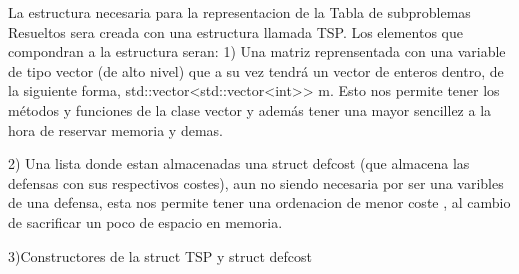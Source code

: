 La estructura necesaria para la representacion de la Tabla de subproblemas Resueltos
sera creada con una estructura llamada TSP.
Los elementos que compondran a la estructura seran:
    1) Una matriz reprensentada con una variable de tipo vector (de alto nivel)
    que a su vez tendrá un vector de enteros dentro, de la siguiente forma,
    std::vector<std::vector<int>> m.
    Esto nos permite tener los métodos y funciones de la clase vector y además
    tener una mayor sencillez a la hora de reservar memoria y demas.

    2) Una lista donde estan almacenadas una struct defcost (que almacena las 
    defensas con sus respectivos costes), aun no siendo necesaria por ser una varibles 
    de una defensa, esta nos permite tener una ordenacion de menor coste , al cambio 
    de sacrificar un poco de espacio en memoria.

    3)Constructores de la struct TSP y struct defcost
